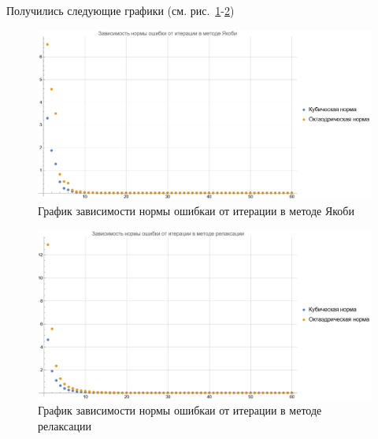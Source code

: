 \documentclass{article}
\begin{document}
\begin{enumerate}
        Получились следующие графики (см. рис.~\ref{jacoby_err_vs_iter}-\ref{relax_err_vs_iter})

        \begin{figure}[H]
            \includegraphics[width=\textwidth]{../lab_iter_methods/graph1_err_vs_iter_jacoby.png}
            \caption{График зависимости нормы ошибкаи от итерации в методе Якоби}
            \label{jacoby_err_vs_iter}
        \end{figure}

        \begin{figure}[H]
            \includegraphics[width=\textwidth]{../lab_iter_methods/graph1_err_vs_iter_relax.png}
            \caption{График зависимости нормы ошибкаи от итерации в методе релаксации}
            \label{relax_err_vs_iter}
        \end{figure}

        \end{enumerate}    
\end{document}
